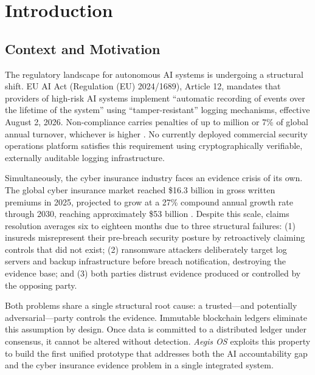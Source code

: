 \documentclass[12pt,a4paper]{article}
\begin{document}
\clearpage
\tableofcontents
\clearpage

\setcounter{page}{1}

\section{Introduction}
\label{sec:intro}

\subsection{Context and Motivation}
\label{sec:motivation}

The regulatory landscape for autonomous AI systems is undergoing a
structural shift. EU AI Act (Regulation (EU) 2024/1689), Article 12,
mandates that providers of high-risk AI systems implement
``automatic recording of events over the lifetime of the system''
using ``tamper-resistant'' logging mechanisms, effective August 2, 2026.
Non-compliance carries penalties of up to  million or 7\%
of global annual turnover, whichever is higher \cite{euaiact2024}.
No currently deployed commercial security operations platform satisfies
this requirement using cryptographically verifiable, externally auditable
logging infrastructure.

Simultaneously, the cyber insurance industry faces an evidence crisis
of its own. The global cyber insurance market reached \$16.3 billion in
gross written premiums in 2025, projected to grow at a 27\% compound
annual growth rate through 2030, reaching approximately \$53 billion
\cite{cybermarket2024}. Despite this scale, claims resolution averages
six to eighteen months due to three structural failures: (1) insureds
misrepresent their pre-breach security posture by retroactively claiming
controls that did not exist; (2) ransomware attackers deliberately target
log servers and backup infrastructure before breach notification, destroying
the evidence base; and (3) both parties distrust evidence produced or
controlled by the opposing party.

Both problems share a single structural root cause: a trusted---and
potentially adversarial---party controls the evidence. Immutable blockchain
ledgers eliminate this assumption by design. Once data is committed to a
distributed ledger under consensus, it cannot be altered without detection.
\emph{Aegis OS} exploits this property to build the first unified
prototype that addresses both the AI accountability gap and the cyber
insurance evidence problem in a single integrated system.
\end{document}

